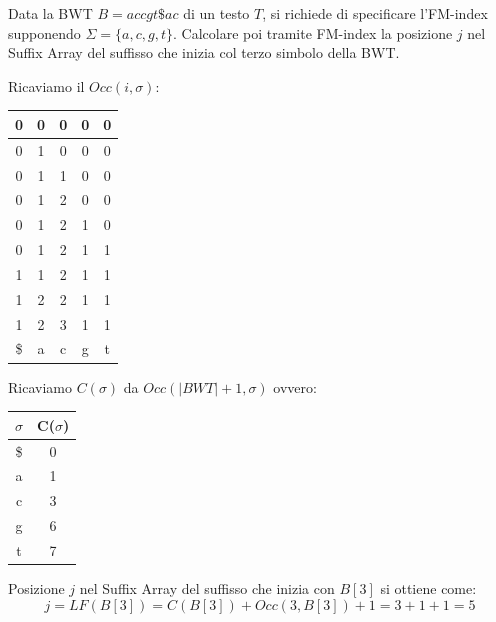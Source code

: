 \begin{esempio}
    Data la BWT $B = accgt\$ac$ di un testo $T$, si richiede di specificare
        l'FM-index supponendo $\Sigma = \{a, c, g, t\}$. Calcolare poi tramite
        FM-index la posizione $j$ nel Suffix Array del suffisso che inizia col
        terzo simbolo della BWT.

        Ricaviamo il $Occ(i, \sigma)$:
        \begin{table}[!ht]
            \centering
            \begin{tabular}{|c|c|c|c|c|}
                \hline
                0  & 0 & 0 & 0 & 0 \\ \hline
                0  & 1 & 0 & 0 & 0 \\ \hline
                0  & 1 & 1 & 0 & 0 \\ \hline
                0  & 1 & 2 & 0 & 0 \\ \hline
                0  & 1 & 2 & 1 & 0 \\ \hline
                0  & 1 & 2 & 1 & 1 \\ \hline
                1  & 1 & 2 & 1 & 1 \\ \hline
                1  & 2 & 2 & 1 & 1 \\ \hline
                1  & 2 & 3 & 1 & 1 \\ \hline
                \$ & a & c & g & t \\ \hline
            \end{tabular}
        \end{table}

        Ricaviamo $C(\sigma)$ da $Occ(|BWT| + 1, \sigma)$ ovvero:
        \begin{table}[!ht]
            \centering
            \begin{tabular}{|c|c|}
                \hline
                $\sigma$ & C($\sigma$) \\ \hline
                \$       & 0           \\ \hline
                a        & 1           \\ \hline
                c        & 3           \\ \hline
                g        & 6           \\ \hline
                t        & 7           \\ \hline
            \end{tabular}
        \end{table}

        Posizione $j$ nel Suffix Array del suffisso che inizia con $B[3]$ si
    ottiene come:
    \begin{equation}
        j = LF(B[3]) = C(B[3]) + Occ(3, B[3]) + 1 = 3 + 1 + 1 = 5
    \end{equation}
\end{esempio}
